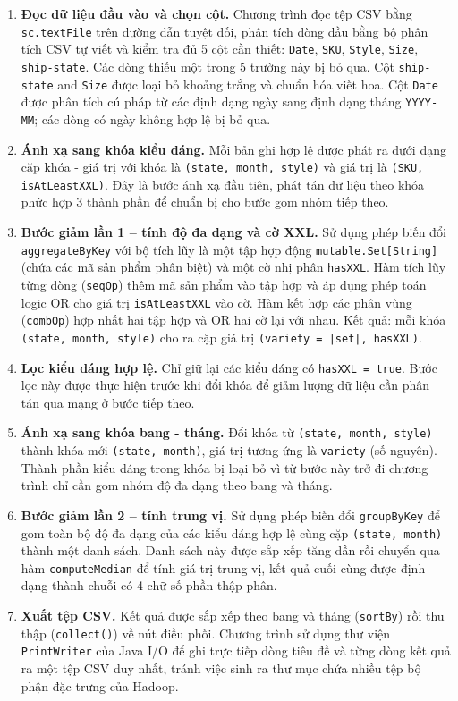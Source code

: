 \begin{enumerate}
    \item \textbf{Đọc dữ liệu đầu vào và chọn cột.} Chương trình đọc tệp CSV bằng \texttt{sc.textFile} trên đường dẫn tuyệt đối, phân tích dòng đầu bằng bộ phân tích CSV tự viết và kiểm tra đủ 5 cột cần thiết: \texttt{Date}, \texttt{SKU}, \texttt{Style}, \texttt{Size}, \texttt{ship-state}. Các dòng thiếu một trong 5 trường này bị bỏ qua. Cột \texttt{ship-state} and \texttt{Size} được loại bỏ khoảng trắng và chuẩn hóa viết hoa. Cột \texttt{Date} được phân tích cú pháp từ các định dạng ngày sang định dạng tháng \texttt{YYYY-MM}; các dòng có ngày không hợp lệ bị bỏ qua.

    \item \textbf{Ánh xạ sang khóa kiểu dáng.} Mỗi bản ghi hợp lệ được phát ra dưới dạng cặp khóa - giá trị với khóa là \texttt{(state, month, style)} và giá trị là \texttt{(SKU, isAtLeastXXL)}. Đây là bước ánh xạ đầu tiên, phát tán dữ liệu theo khóa phức hợp 3 thành phần để chuẩn bị cho bước gom nhóm tiếp theo.

    \item \textbf{Bước giảm lần 1 -- tính độ đa dạng và cờ XXL.} Sử dụng phép biến đổi \texttt{aggregateByKey} với bộ tích lũy là một tập hợp động \texttt{mutable.Set[String]} (chứa các mã sản phẩm phân biệt) và một cờ nhị phân \texttt{hasXXL}. Hàm tích lũy từng dòng (\texttt{seqOp}) thêm mã sản phẩm vào tập hợp và áp dụng phép toán logic OR cho giá trị \texttt{isAtLeastXXL} vào cờ. Hàm kết hợp các phân vùng (\texttt{combOp}) hợp nhất hai tập hợp và OR hai cờ lại với nhau. Kết quả: mỗi khóa \texttt{(state, month, style)} cho ra cặp giá trị \texttt{(variety = |set|, hasXXL)}.

    \item \textbf{Lọc kiểu dáng hợp lệ.} Chỉ giữ lại các kiểu dáng có \texttt{hasXXL = true}. Bước lọc này được thực hiện trước khi đổi khóa để giảm lượng dữ liệu cần phân tán qua mạng ở bước tiếp theo.

    \item \textbf{Ánh xạ sang khóa bang - tháng.} Đổi khóa từ \texttt{(state, month, style)} thành khóa mới \texttt{(state, month)}, giá trị tương ứng là \texttt{variety} (số nguyên). Thành phần kiểu dáng trong khóa bị loại bỏ vì từ bước này trở đi chương trình chỉ cần gom nhóm độ đa dạng theo bang và tháng.

    \item \textbf{Bước giảm lần 2 -- tính trung vị.} Sử dụng phép biến đổi \texttt{groupByKey} để gom toàn bộ độ đa dạng của các kiểu dáng hợp lệ cùng cặp \texttt{(state, month)} thành một danh sách. Danh sách này được sắp xếp tăng dần rồi chuyển qua hàm \texttt{computeMedian} để tính giá trị trung vị, kết quả cuối cùng được định dạng thành chuỗi có 4 chữ số phần thập phân.

    \item \textbf{Xuất tệp CSV.} Kết quả được sắp xếp theo bang và tháng (\texttt{sortBy}) rồi thu thập (\texttt{collect()}) về nút điều phối. Chương trình sử dụng thư viện \texttt{PrintWriter} của Java I/O để ghi trực tiếp dòng tiêu đề và từng dòng kết quả ra một tệp CSV duy nhất, tránh việc sinh ra thư mục chứa nhiều tệp bộ phận đặc trưng của Hadoop.
\end{enumerate}

